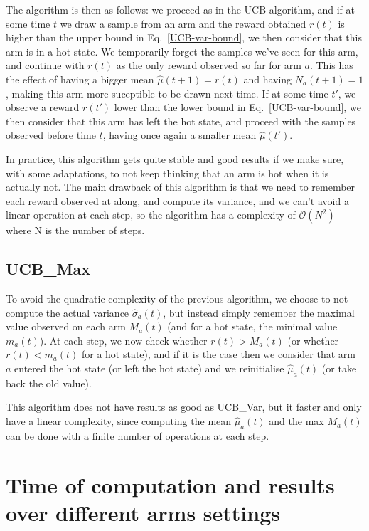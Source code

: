 \documentclass{article} %
\begin{document}
The algorithm is then as follows: we proceed as in the UCB algorithm, and if at
some time $t$ we draw a sample from an arm and the reward obtained $r(t)$ is higher than the upper bound
in Eq.~\ref{UCB-var-bound}, we then consider that this arm is in a hot state.
We temporarily forget the samples we've seen for this arm, and continue
with $r(t)$ as the only reward observed so far for arm $a$. This has the effect
of having a bigger mean $\hat\mu(t+1) = r(t)$ and having $N_a(t+1) = 1$, making this arm more suceptible
to be drawn next time. If at some time $t'$, we observe a reward $r(t')$ lower
than the lower bound in Eq.~\ref{UCB-var-bound}, we then consider that this arm has
left the hot state, and proceed with the samples observed before time $t$, having
once again a smaller mean $\hat\mu(t')$.

In practice, this algorithm gets quite stable and good results if we make sure,
with some adaptations, to not keep thinking that an arm is hot when it is actually
not. The main drawback of this algorithm is that we need to remember each
reward observed at along, and compute its variance, and we can't avoid
a linear operation at each step, so the algorithm has a complexity of $\mathcal{O}(N^2)$ where N
is the number of steps.

\subsection{UCB\_Max}

To avoid the quadratic complexity of the previous algorithm, we choose to not compute
the actual variance $\hat\sigma_a(t)$, but instead simply remember the maximal value
observed on each arm $M_a(t)$ (and for a hot state, the minimal value $m_a(t)$).
At each step, we now check whether $r(t) > M_a(t)$ (or whether $r(t) < m_a(t)$ for a hot state),
and if it is the case then we consider that arm $a$ entered the hot state (or left the hot state)
and we reinitialise $\hat\mu_a(t)$ (or take back the old value).

This algorithm does not have results as good as UCB\_Var, but it faster and only have
a linear complexity, since computing the mean $\hat\mu_a(t)$ and the max $M_a(t)$
can be done with a finite number of operations at each step.


\section{Time of computation and results over different arms settings}
\end{document}
